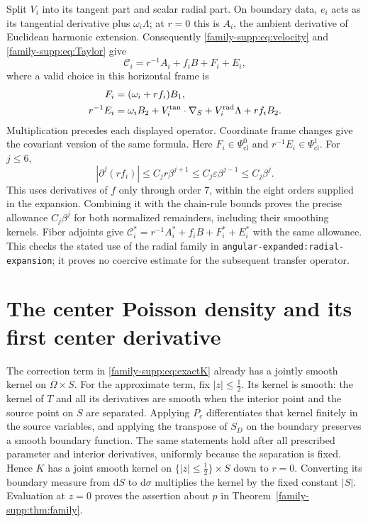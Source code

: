 \documentclass[11pt]{article}
\theoremstyle{definition}
\theoremstyle{remark}
\newcommand{\dd}{\mathrm d}
\numberwithin{equation}{section}
\providecommand{\Ps}{\Psi_{\mathrm{cl}}}
\begin{document}
Split $V_i$ into its tangent part and scalar radial part. On boundary
data, $e_i$ acts as its tangential derivative plus $\omega_i\Lambda$;
at $r=0$ this is $A_i$, the ambient derivative of Euclidean harmonic
extension. Consequently \eqref{family-supp:eq:velocity} and \eqref{family-supp:eq:Taylor} give
\begin{equation}\label{family-supp:eq:traceexp}
 \mathcal C_i=r^{-1}A_i+f_i B+F_i+E_i,
\end{equation}
where a valid choice in this horizontal frame is
\begin{align}
 F_i&=(\omega_i+r f_i)B_1,\label{family-supp:eq:F}\\
 r^{-1}E_i&=\omega_iB_2+V_i^{\rm tan}\cdot\nabla_S
                         +V_i^{\rm rad}\Lambda+r f_iB_2.\label{family-supp:eq:E}
\end{align}
Multiplication precedes each displayed operator. Coordinate frame
changes give the covariant version of the same formula. Here $F_i\in\Ps^0$
and $r^{-1}E_i\in\Ps^1$. For $j\leq6$,
\[
 |\partial^j(r f_i)|\leq C_jr\beta^{j+1}
                      \leq C_j\varepsilon\beta^{j-1}\leq C_j\beta^j.
\]
This uses derivatives of $f$ only through order $7$, within the eight
orders supplied in the expansion. Combining it with the chain-rule bounds
proves the precise allowance $C_j\beta^j$ for both normalized remainders,
including their smoothing kernels. Fiber adjoints give
$\mathcal C_i^*=r^{-1}A_i^*+f_iB+F_i^*+E_i^*$ with the same allowance.
This checks the stated use of the radial family in
\nolinkurl{angular-expanded:radial-expansion}; it proves no coercive estimate
for the subsequent transfer operator.

\section{The center Poisson density and its first center derivative}
\label{family-supp:sec:poisson}

The correction term in \eqref{family-supp:eq:exactK} already has a jointly smooth
kernel on $\overline\Omega\times S$. For the approximate term, fix
$|z|\leq\tfrac12$. Its kernel is smooth: the kernel of $T$ and all its
derivatives are smooth when the interior point and the source point on
$S$ are separated. Applying $P_c$ differentiates that kernel finitely in
the source variables, and applying the transpose of $S_D$ on the boundary
preserves a smooth boundary function. The same statements hold after
all prescribed parameter and interior derivatives, uniformly because
the separation is fixed. Hence $K$ has a joint smooth kernel on
$\{|z|\leq\tfrac12\}\times S$ down to $r=0$. Converting its boundary
measure from $\dd S$ to $\dd\sigma$ multiplies the kernel by the fixed
constant $|S|$. Evaluation at $z=0$ proves the assertion about $p$ in
Theorem~\ref{family-supp:thm:family}.
\end{document}
